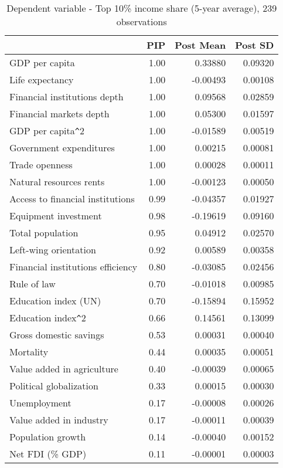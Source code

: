 \documentclass[a4paper,11pt]{article}
\begin{document}
\begin{table}[!ht]
    \footnotesize
    \centering
    \caption{Dependent variable - Top 10\% income share (5-year average), 239 observations}
    \label{table:gini1y}
    \begin{tabular}{lrrr}
      \toprule
      & PIP & Post Mean & Post SD \\
      \hline
      GDP per capita & 1.00 & 0.33880 & 0.09320 \\
  Life expectancy & 1.00 & -0.00493 & 0.00108 \\
  Financial institutions depth & 1.00 & 0.09568 & 0.02859 \\ 
  Financial markets depth & 1.00 & 0.05300 & 0.01597 \\
  GDP per capita\verb|^|2 & 1.00 & -0.01589 & 0.00519 \\
  Government expenditures & 1.00 & 0.00215 & 0.00081 \\ 
  Trade openness & 1.00 & 0.00028 & 0.00011 \\ 
  Natural resources rents & 1.00 & -0.00123 & 0.00050 \\ 
  Access to financial institutions & 0.99 & -0.04357 & 0.01927 \\
  Equipment investment & 0.98 & -0.19619 & 0.09160 \\ 
  Total population & 0.95 & 0.04912 & 0.02570 \\
  Left-wing orientation & 0.92 & 0.00589 & 0.00358 \\
  Financial institutions efficiency & 0.80 & -0.03085 & 0.02456 \\ 
  Rule of law & 0.70 & -0.01018 & 0.00985 \\ 
  Education index (UN) & 0.70 & -0.15894 & 0.15952 \\ 
  Education index\verb|^|2 & 0.66 & 0.14561 & 0.13099 \\
  Gross domestic savings & 0.53 & 0.00031 & 0.00040 \\ 
  Mortality & 0.44 & 0.00035 & 0.00051 \\ 
  Value added in agriculture & 0.40 & -0.00039 & 0.00065 \\
  Political globalization & 0.33 & 0.00015 & 0.00030 \\
  Unemployment & 0.17 & -0.00008 & 0.00026 \\ 
  Value added in industry & 0.17 & -0.00011 & 0.00039 \\
  Population growth & 0.14 & -0.00040 & 0.00152 \\
  Net FDI (\% GDP) & 0.11 & -0.00001 & 0.00003 \\

\end{tabular}
\end{table}
\end{document}
